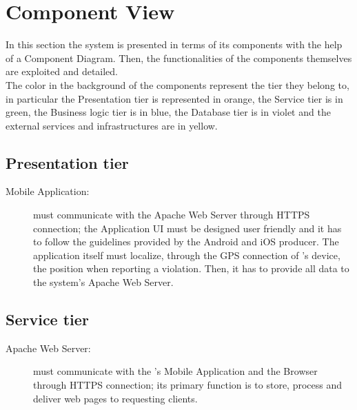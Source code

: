 \documentclass[../../DD.tex]{subfiles}
\begin{document}
\section{Component View\label{sect:2.2}}
 In this section the system is presented in terms of its components with the help of a Component Diagram. Then, the functionalities of the components themselves are exploited and detailed.\\
 
The color in the background of the components represent the tier they belong to, in particular the Presentation tier is represented in orange, the Service tier is in green, the Business logic tier is in blue, the Database tier is in violet and the external services and infrastructures are in yellow.

	
\subsection{Presentation tier\label{sect:2.2.1}}
	\begin{description}
	\item[Mobile Application:] must communicate with the Apache Web Server through HTTPS connection; the Application UI must be designed user friendly and it has to follow the guidelines provided by the Android and iOS producer. The application itself must localize, through the GPS connection of 's device, the position when reporting a violation. Then, it has to provide all  data to the system's Apache Web Server.
	\end{description}
	
\subsection{Service tier\label{sect:2.2.2}}
	\begin{description}
	\item[Apache Web Server:] must communicate with the 's Mobile Application and the  Browser through HTTPS connection; its primary function is to store, process and deliver web pages to requesting clients.
	\end{description}
	
\end{document}
